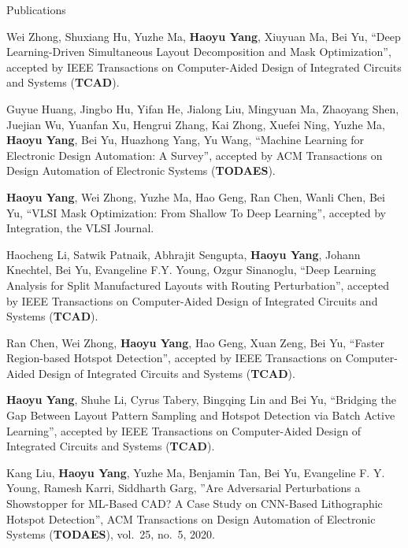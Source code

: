 \begin{rSection}{Publications}
\begin{description}[font=\normalfont]
\item[{[J12]}]{
	Wei Zhong, Shuxiang Hu, Yuzhe Ma, \textbf{Haoyu Yang}, Xiuyuan Ma, Bei Yu,
	``Deep Learning-Driven Simultaneous Layout Decomposition and Mask Optimization'', 
	accepted by IEEE Transactions on Computer-Aided Design of Integrated Circuits and Systems (\textbf{TCAD}).
}


\item[{[J11]}]{
	Guyue Huang, Jingbo Hu, Yifan He, Jialong Liu, Mingyuan Ma, Zhaoyang Shen, Juejian Wu, Yuanfan Xu, Hengrui Zhang, Kai Zhong, Xuefei Ning, Yuzhe Ma, \textbf{Haoyu Yang}, Bei Yu, Huazhong Yang, Yu Wang,
	``Machine Learning for Electronic Design Automation: A Survey'', 
	accepted by ACM Transactions on Design Automation of Electronic Systems (\textbf{TODAES}).
}
	
\item[{[J10]}]{
	\textbf{Haoyu Yang}, Wei Zhong, Yuzhe Ma, Hao Geng, Ran Chen, Wanli Chen, Bei Yu,
	``VLSI Mask Optimization: From Shallow To Deep Learning'', 
	accepted by Integration, the VLSI Journal.
}

\item[{[J9]}]{
	Haocheng Li, Satwik Patnaik, Abhrajit Sengupta, \textbf{Haoyu Yang}, Johann Knechtel, Bei Yu, Evangeline F.Y. Young, Ozgur Sinanoglu, 
	``Deep Learning Analysis for Split Manufactured Layouts with Routing Perturbation'',  
	accepted by IEEE Transactions on Computer-Aided Design of Integrated Circuits and Systems (\textbf{TCAD}).
}
	
\item[{[J8]}]{
	Ran Chen, Wei Zhong, \textbf{Haoyu Yang}, Hao Geng, Xuan Zeng, Bei Yu, ``Faster Region-based Hotspot Detection'',  
	accepted by IEEE Transactions on Computer-Aided Design of Integrated Circuits and Systems (\textbf{TCAD}).
}
	
\item[{[J7]}]{
	\textbf{Haoyu Yang}, Shuhe Li, Cyrus Tabery, Bingqing Lin and Bei Yu, ``Bridging the Gap Between Layout Pattern Sampling and Hotspot Detection via Batch Active Learning'', accepted by IEEE Transactions on Computer-Aided Design of Integrated Circuits and Systems (\textbf{TCAD}).
}	

\item[{[J6]}]{
	Kang Liu, \textbf{Haoyu Yang}, Yuzhe Ma, Benjamin Tan, Bei Yu, Evangeline F. Y. Young, Ramesh Karri, Siddharth Garg, ''Are Adversarial Perturbations a Showstopper for ML-Based CAD? A Case Study on CNN-Based Lithographic Hotspot Detection'', ACM Transactions on Design Automation of Electronic Systems (\textbf{TODAES}), vol.~25, no.~5, 2020.
}	
	

\end{description}
\end{rSection}

